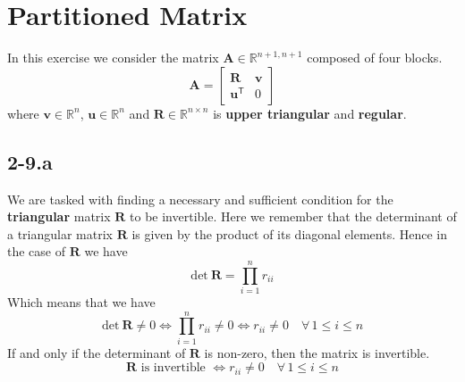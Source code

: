 \documentclass{article}
\begin{document}
\section*{Partitioned Matrix}
In this exercise we consider the matrix $\mathbf{A} \in \mathbb{R}^{n+1,n+1}$ composed of four blocks.
\begin{equation*}
    \mathbf{A} = 
    \begin{bmatrix}
    \mathbf{R} & \mathbf{v} \\
    \mathbf{u}^{\mathsf{T}} & 0
    \end{bmatrix}
\end{equation*}
where $\mathbf{v}\in \mathbb{R}^{n}$, $\mathbf{u}\in \mathbb{R}^{n}$ and $\mathbf{R} \in \mathbb{R}^{n \times n}$ is \textbf{upper triangular} and \textbf{regular}.
\subsection*{2-9.a} 
We are tasked with finding a necessary and sufficient condition for the \textbf{triangular} matrix $\mathbf{R}$ to be invertible. Here we remember that the determinant of a triangular matrix $\mathbf{R}$ is given by the product of its diagonal elements. Hence in the case of $\mathbf{R}$ we have
\begin{equation*}
    \text{det}\:\mathbf{R} = \prod_{i=1}^{n}r_{ii}
\end{equation*}
Which means that we have
\begin{equation*}
    \text{det}\:\mathbf{R} \neq 0 \Longleftrightarrow  \prod_{i=1}^{n}r_{ii} \neq 0 \Longleftrightarrow r_{ii} \neq 0 \quad \forall \, 1 \leq i \leq n
\end{equation*}
If  and only if the determinant of $\mathbf{R}$ is non-zero, then the matrix is invertible.
\begin{equation*}
    \mathbf{R} \text{ is invertible } \Longleftrightarrow r_{ii} \neq 0 \quad \forall \, 1 \leq i \leq n
\end{equation*}
\end{document}
